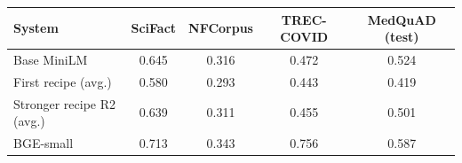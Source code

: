 \begin{tabular}{lcccc}
\toprule
System & SciFact & NFCorpus & TREC-COVID & MedQuAD (test) \\
\midrule
Base MiniLM & 0.645 & 0.316 & 0.472 & 0.524 \\
First recipe (avg.) & 0.580 & 0.293 & 0.443 & 0.419 \\
Stronger recipe R2 (avg.) & 0.639 & 0.311 & 0.455 & 0.501 \\
BGE-small & 0.713 & 0.343 & 0.756 & 0.587 \\
\bottomrule
\end{tabular}
